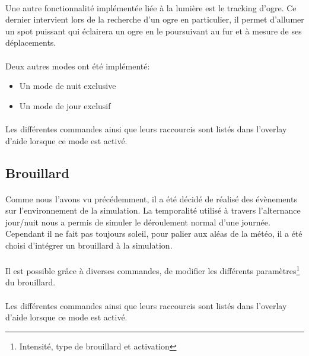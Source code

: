 \paragraph{}
Une autre fonctionnalité implémentée liée à la lumière est le tracking d'ogre.
Ce dernier intervient lors de la recherche d'un ogre en particulier, il permet
d'allumer un spot puissant qui éclairera un ogre en le poursuivant au fur et à
mesure de ses déplacements.

\paragraph{}
Deux autres modes ont été implémenté:\\
\begin{itemize}
  \item Un mode de nuit exclusive
  \item Un mode de jour exclusif\\
\end{itemize}

\paragraph{}
Les différentes commandes ainsi que leurs raccourcis sont listés dans l'overlay
d'aide lorsque ce mode est activé.

\subsection{Brouillard}

\paragraph{}
Comme nous l'avons vu précédemment, il a été décidé de réalisé des évènements
sur l'environnement de la simulation. La temporalité utilisé à travers
l'alternance jour/nuit nous a permis de simuler le déroulement normal d'une
journée. Cependant il ne fait pas toujours soleil, pour palier aux aléas de la
météo, il a été choisi d'intégrer un brouillard à la simulation.

\paragraph{}
Il est possible grâce à diverses commandes, de modifier les différents
paramètres\footnote{Intensité, type de brouillard et activation} du brouillard.

\paragraph{}
Les différentes commandes ainsi que leurs raccourcis sont listés dans l'overlay
d'aide lorsque ce mode est activé.


